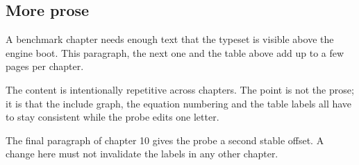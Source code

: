 \subsection{More prose}
A benchmark chapter needs enough text that the type\-set is visible above the
engine boot. This paragraph, the next one and the table above add up to a few
pages per chapter.

The content is intentionally repetitive across chapters. The point is not the
prose; it is that the include graph, the equation numbering and the table
labels all have to stay consistent while the probe edits one letter.

The final paragraph of chapter 10 gives the probe a second stable offset. A
change here must not invalidate the labels in any other chapter.
